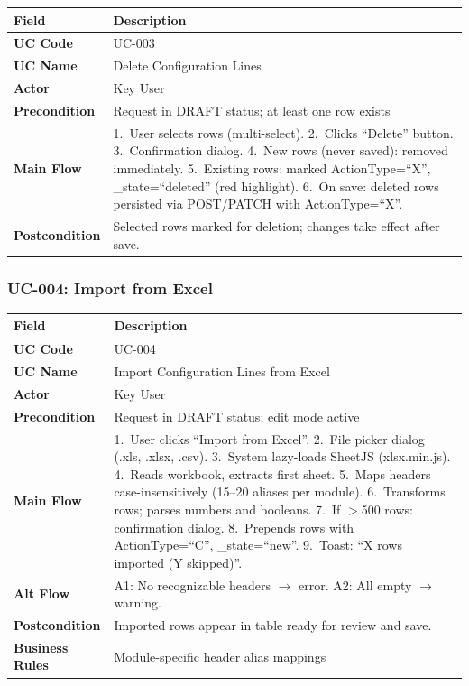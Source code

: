 \documentclass[12pt,a4paper]{report}
\begin{document}
\begin{longtable}{|>{\bfseries}p{2.8cm}|p{12cm}|}
  \hline
  \rowcolor{tableheadpeach}
  \textbf{Field} & \textbf{Description} \\ \hline
  \endhead \hline \endfoot
  UC Code       & UC-003 \\ \hline
  UC Name       & Delete Configuration Lines \\ \hline
  Actor         & Key User \\ \hline
  Precondition  & Request in DRAFT status; at least one row exists \\ \hline
  Main Flow     & 1.~User selects rows (multi-select).
                  2.~Clicks ``Delete'' button.
                  3.~Confirmation dialog.
                  4.~New rows (never saved): removed immediately.
                  5.~Existing rows: marked ActionType=``X'', \_state=``deleted'' (red highlight).
                  6.~On save: deleted rows persisted via POST/PATCH with ActionType=``X''. \\ \hline
  Postcondition & Selected rows marked for deletion; changes take effect after save. \\ \hline
\end{longtable}

\subsubsection{UC-004: Import from Excel}

\begin{longtable}{|>{\bfseries}p{2.8cm}|p{12cm}|}
  \hline
  \rowcolor{tableheadpeach}
  \textbf{Field} & \textbf{Description} \\ \hline
  \endhead \hline \endfoot
  UC Code       & UC-004 \\ \hline
  UC Name       & Import Configuration Lines from Excel \\ \hline
  Actor         & Key User \\ \hline
  Precondition  & Request in DRAFT status; edit mode active \\ \hline
  Main Flow     & 1.~User clicks ``Import from Excel''.
                  2.~File picker dialog (.xls, .xlsx, .csv).
                  3.~System lazy-loads SheetJS (xlsx.min.js).
                  4.~Reads workbook, extracts first sheet.
                  5.~Maps headers case-insensitively (15--20 aliases per module).
                  6.~Transforms rows; parses numbers and booleans.
                  7.~If $>$500 rows: confirmation dialog.
                  8.~Prepends rows with ActionType=``C'', \_state=``new''.
                  9.~Toast: ``X rows imported (Y skipped)''. \\ \hline
  Alt Flow      & A1: No recognizable headers $\rightarrow$ error. A2: All empty $\rightarrow$ warning. \\ \hline
  Postcondition & Imported rows appear in table ready for review and save. \\ \hline
  Business Rules& Module-specific header alias mappings \\ \hline
\end{longtable}
\end{document}
